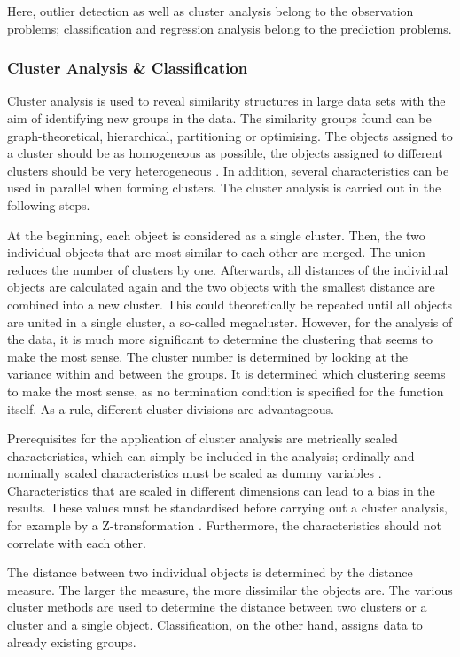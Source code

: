 \bigskip

Here, outlier detection as well as cluster analysis belong to the observation problems; classification and regression analysis belong to the prediction problems.


\subsubsection{Cluster Analysis \& Classification}

Cluster analysis is used to reveal similarity structures in large data sets with the aim of identifying new groups in the data. The similarity groups found can be graph-theoretical, hierarchical, partitioning or optimising. The objects assigned to a cluster should be as homogeneous as possible, the objects assigned to different clusters should be very heterogeneous \cite{Janssen.2007}. In addition, several characteristics can be used in parallel when forming clusters. The cluster analysis is carried out in the following steps.

At the beginning, each object is considered as a single cluster. Then, the two individual objects that are most similar to each other are merged. The union reduces the number of clusters by one. Afterwards, all distances of the individual objects are calculated again and the two objects with the smallest distance are combined into a new cluster. This could theoretically be repeated until all objects are united in a single cluster, a so-called megacluster. However, for the analysis of the data, it is much more significant to determine the clustering that seems to make the most sense. The cluster number is determined by looking at the variance within and between the groups. It is determined which clustering seems to make the most sense, as no termination condition is specified for the function itself. As a rule, different cluster divisions are advantageous.

Prerequisites for the application of cluster analysis are metrically scaled characteristics, which can simply be included in the analysis; ordinally and nominally scaled characteristics must be scaled as dummy variables \cite{Janssen.2007}. Characteristics that are scaled in different dimensions can lead to a bias in the results. These values must be standardised before carrying out a cluster analysis, for example by a Z-transformation \cite{Janssen.2007}. Furthermore, the characteristics should not correlate with each other.

The distance between two individual objects is determined by the distance measure. The larger the measure, the more dissimilar the objects are. The various cluster methods \cite{Janssen.2007} are used to determine the distance between two clusters or a cluster and a single object. Classification, on the other hand, assigns data to already existing groups.

